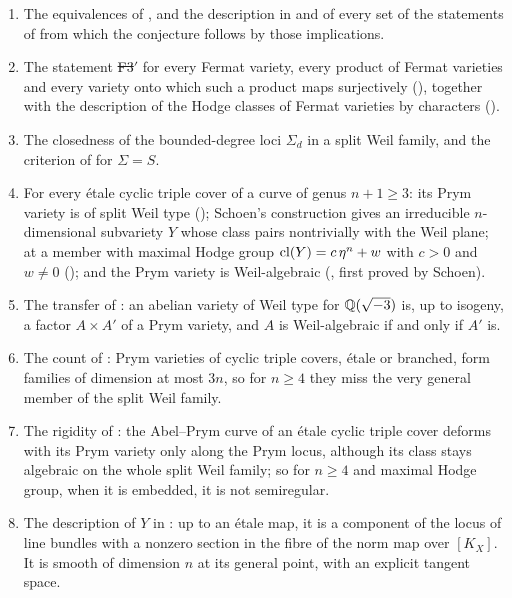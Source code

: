 \begin{enumerate}[label=\textup{(\arabic*)}]
the inductive structure of Shioda and Ran, Aoki's cycles \cite{Aok87}, and
the classical nonvanishing of $B_{1,\chi}$ for odd primitive Dirichlet
characters \cite{Was97}.
\item The equivalences of , and the description in 
and  of every set of the statements of 
from which the conjecture follows by those implications.
\item The statement \st{F3$'$} for every Fermat variety, every product of
Fermat varieties and every variety onto which such a product maps
surjectively (), together with the description of the Hodge classes of Fermat varieties by
characters ().
\item The closedness of the bounded-degree loci $\Sigma_{d}$ in a split Weil
family, and the criterion of  for $\Sigma=S$.
\item For every \'etale cyclic triple cover of a curve of genus $n+1\ge3$:
its Prym variety is of split Weil type (); Schoen's
construction gives an irreducible $n$-dimensional subvariety $Y$ whose class
pairs nontrivially with the Weil plane; at a member with maximal Hodge group
$\operatorname{cl}(Y)=c\,\eta^{n}+w$ with $c>0$ and $w\ne0$ (); and the Prym
variety is Weil-algebraic (, first proved by Schoen).
\item The transfer of : an abelian variety of Weil type for
$\mathbb{Q}(\sqrt{-3})$ is, up to isogeny, a factor $A\times A'$ of a Prym variety,
and $A$ is Weil-algebraic if and only if $A'$ is.
\item The count of : Prym varieties of cyclic triple
covers, \'etale or branched, form families of dimension at most $3n$, so for
$n\ge4$ they miss the very general member of the split Weil family.
\item The rigidity of : the Abel--Prym curve of an
\'etale cyclic triple cover deforms with its Prym variety only along the
Prym locus, although its class stays algebraic on the whole split Weil
family; so for $n\ge4$ and maximal Hodge group, when it is embedded, it is
not semiregular.
\item The description of $Y$ in : up to an \'etale map,
it is a component of the locus of line bundles with a nonzero section in
the fibre of the norm map over $[K_{X}]$. It is smooth of dimension $n$ at
its general point, with an explicit tangent space.
\end{enumerate}

